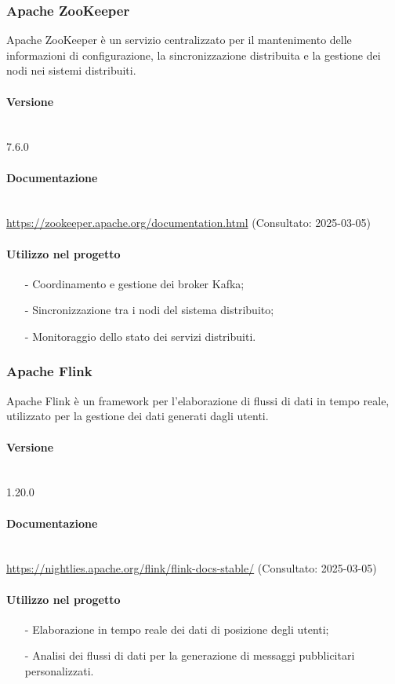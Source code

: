 \documentclass[10pt]{article}
\newcommand{\myparagraph}[1]{\paragraph{#1}\mbox{}\\\vspace{0.4em}}
\begin{document}
\begin{justify}
    \subsubsection{Apache ZooKeeper}
    Apache ZooKeeper è un servizio centralizzato per il mantenimento delle informazioni di configurazione, la sincronizzazione distribuita e la gestione dei nodi nei sistemi distribuiti.

    \myparagraph{Versione} 
    7.6.0

    \myparagraph{Documentazione} 
    \textcolor{blue}{\url{https://zookeeper.apache.org/documentation.html}} (Consultato: 2025-03-05)

    \paragraph{Utilizzo nel progetto}
    \begin{itemize}
        \item[-] Coordinamento e gestione dei broker Kafka;
        \item[-] Sincronizzazione tra i nodi del sistema distribuito;
        \item[-] Monitoraggio dello stato dei servizi distribuiti.
    \end{itemize}

    \subsubsection{Apache Flink}
    Apache Flink è un framework per l'elaborazione di flussi di dati in tempo reale, utilizzato per la gestione dei dati generati dagli utenti.
    
    \myparagraph{Versione} 
    1.20.0 %
    
    \myparagraph{Documentazione} 
    \textcolor{blue}{\url{https://nightlies.apache.org/flink/flink-docs-stable/}} (Consultato: 2025-03-05)
    
    \paragraph{Utilizzo nel progetto}
    \begin{itemize}
        \item[-] Elaborazione in tempo reale dei dati di posizione degli utenti;
        \item[-] Analisi dei flussi di dati per la generazione di messaggi pubblicitari personalizzati.
    \end{itemize}
    

\end{justify}
\end{document}
